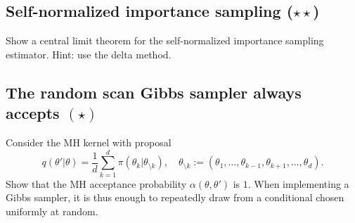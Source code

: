 \documentclass{article}
\newif\ifsolutions
\newcommand\solution[1]{
\ifsolutions
\begin{mdframed}[style=MyFrame]
\textcolor{bleu}{\textbf{Solution:} #1}
\end{mdframed}
\fi
}
\begin{document}
\solution{
\begin{enumerate}
\item By definition, we write the product of the conditionals of each node given its parents, that is,
\begin{equation}
  p(x,y,z,\theta) = p(y\vert z,x)p(x\vert\theta)p(\theta)p(z).
\label{e:factorization}
\end{equation}
\item By \eqref{e:factorization},
$$ p(x,z) = \int p(x,y,z,\theta) \d y\d \theta = p(z) \int p(x\vert\theta)p(\theta)\d\theta.$$
In particular,
$$p(x) = \int p(x,z)\d z = \int p(x\vert\theta)p(\theta)\d\theta,$$ so that $p(x,z) = p(x)p(z)$.
\item We use Bayes' theorem and \eqref{e:factorization},
\begin{align*}
p(x,z\vert\theta) &= \int p(x,y,z\vert\theta)\d y\\
&= \int \frac{p(x,y,z,\theta)}{p(\theta)}\d y\\
&= \int p(y\vert z,x)p(x\vert\theta)p(z) \d y\\
&= p(x\vert\theta)p(z).
\end{align*}
In particular,
$$
p(z\vert\theta) = \int p(x,z\vert\theta) \d x = p(z),
$$
so that $p(x,z\vert\theta) = p(x\vert\theta)p(z\vert\theta)$.
\end{enumerate}
}

\subsection{Self-normalized importance sampling ($\star\star$)}
Show a central limit theorem for the self-normalized importance sampling estimator. Hint: use the delta method.

\subsection{The random scan Gibbs sampler always accepts $(\star)$}
Consider the MH kernel with proposal
$$
q(\theta'\vert\theta) = \frac1d \sum_{k=1}^d \pi(\theta_k\vert \theta_{\setminus k}), \quad \theta_{\setminus k}:= (\theta_1,\dots,\theta_{k-1},\theta_{k+1},\dots,\theta_d).
$$
Show that the MH acceptance probability $\alpha(\theta,\theta')$ is $1$. When implementing a Gibbs sampler, it is thus enough to repeatedly draw from a conditional chosen uniformly at random.
\end{document}
